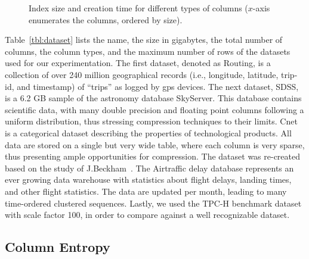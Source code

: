\begin{figure}[t]
\begin{tabular}{cccc}
\end{tabular}
\caption{Index size and creation time for different types of columns ($x$-axis enumerates the columns, ordered by size).}
\label{fig:storage}
\end{figure}

Table~\ref{tbl:dataset} lists the name, the size in gigabytes, the total number
of columns, the column types, and the maximum number of rows of the datasets
used for our experimentation. The first dataset, denoted as Routing, is a
collection of over 240 million geographical records (i.e., longitude, latitude,
trip-id, and timestamp) of ``trips'' as logged by gps devices. The next
dataset, SDSS, is a 6.2 GB sample of the astronomy database
SkyServer. This database contains
scientific data, with many double precision and floating point columns
following a uniform distribution, thus stressing compression techniques to their
limits. Cnet is a categorical dataset describing the properties of technological
products. All data are stored on a single but very wide table, where each
column is very sparse, thus presenting ample opportunities for
compression. The dataset was re-created based on the study of
J.Beckham~\cite{cnet}. The Airtraffic delay database represents an ever growing data warehouse with statistics about flight
delays, landing times, and other flight statistics. The data are updated per
month, leading to many time-ordered clustered sequences. Lastly, we used the
TPC-H benchmark dataset with scale factor 100, in order to
compare against a well recognizable dataset.

\subsection{Column Entropy}

